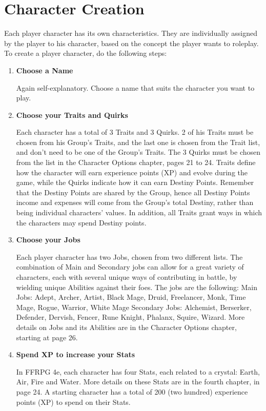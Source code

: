 \section{Character Creation}
\begin{multicols}{2}
Each player character has its own
characteristics. They are individually assigned by
the player to his character, based on the concept
the player wants to roleplay. To create a player
character, do the following steps:
\begin{enumerate}
\item \textbf{Choose a Name}

Again self-explanatory. Choose a name that
suits the character you want to play.

\item \textbf{Choose your Traits and Quirks}

Each character has a total of 3 Traits and 3
Quirks. 2 of his Traits must be chosen from his
Group’s Traits, and the last one is chosen from the
Trait list, and don’t need to be one of the Group's
Traits. The 3 Quirks must be chosen from the list
in the Character Options chapter, pages 21 to 24.
Traits define how the character will earn
experience points (XP) and evolve during the game,
while the Quirks indicate how it can earn Destiny
Points. Remember that the Destiny Points are
shared by the Group, hence all Destiny Points
income and expenses will come from the Group's
total Destiny, rather than being individual
characters’ values. In addition, all Traits grant
ways in which the characters may spend Destiny
points.

\item \textbf{Choose your Jobs}

Each player character has two Jobs, chosen
from two different lists. The combination of Main
and Secondary jobs can allow for a great variety of
characters, each with several unique ways of
contributing in battle, by wielding unique Abilities
against their foes. The jobs are the following:
Main Jobs: Adept, Archer, Artist, Black Mage,
Druid, Freelancer, Monk, Time Mage, Rogue,
Warrior, White Mage
Secondary Jobs: Alchemist, Berserker, Defender,
Dervish, Fencer, Rune Knight, Phalanx, Squire,
Wizard.
More details on Jobs and its Abilities are in the
Character Options chapter, starting at page 26.

\item \textbf{Spend XP to increase your Stats}

In FFRPG 4e, each character has four Stats,
each related to a crystal: Earth, Air, Fire and Water.
More details on these Stats are in the fourth
chapter, in page 24. A starting character has a total
of 200 (two hundred) experience points (XP) to
spend on their Stats.


\end{enumerate}
\end{multicols}
